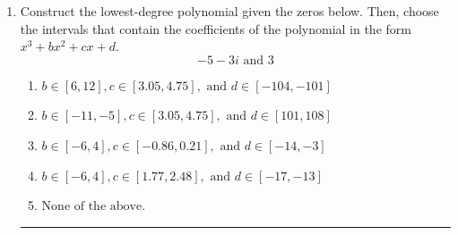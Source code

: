 \documentclass[14pt]{extbook}
\newcommand{\litem}[1]{\item#1\hspace*{-1cm}\rule{\textwidth}{0.4pt}}
\begin{document}
\begin{enumerate}
{\begin{enumerate}[label=\Alph*.]
\end{enumerate} }
\litem{
Construct the lowest-degree polynomial given the zeros below. Then, choose the intervals that contain the coefficients of the polynomial in the form $x^3+bx^2+cx+d$.\[ -5 - 3 i \text{ and } 3 \]\begin{enumerate}[label=\Alph*.]
\item \( b \in [6, 12], c \in [3.05, 4.75], \text{ and } d \in [-104, -101] \)
\item \( b \in [-11, -5], c \in [3.05, 4.75], \text{ and } d \in [101, 108] \)
\item \( b \in [-6, 4], c \in [-0.86, 0.21], \text{ and } d \in [-14, -3] \)
\item \( b \in [-6, 4], c \in [1.77, 2.48], \text{ and } d \in [-17, -13] \)
\item \( \text{None of the above.} \)


\end{enumerate}}
\end{enumerate}
\end{document}
